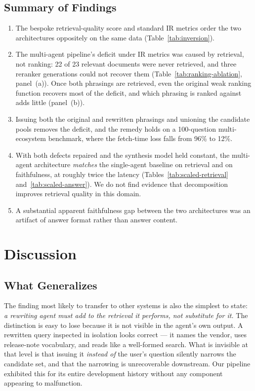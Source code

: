 \documentclass[acmsmall,review,anonymous,screen]{acmart}
\begin{document}
\subsection{Summary of Findings}\label{sec:results-summary}

\begin{enumerate}
  \item The bespoke retrieval-quality score and standard IR metrics order the
  two architectures oppositely on the same data (Table~\ref{tab:inversion}).
  \item The multi-agent pipeline's deficit under IR metrics was caused by
  retrieval, not ranking: 22 of 23 relevant documents were never retrieved,
  and three reranker generations could not recover them
  (Table~\ref{tab:ranking-ablation}, panel~(a)). Once both phrasings are
  retrieved, even the original weak ranking function recovers most of the
  deficit, and which phrasing is ranked against adds little
  (panel~(b)).
  \item Issuing both the original and rewritten phrasings and unioning the
  candidate pools removes the deficit, and the remedy holds on a
  100-question multi-ecosystem benchmark, where the fetch-time loss falls from
  96\% to 12\%.
  \item With both defects repaired and the synthesis model held constant, the
  multi-agent architecture \emph{matches} the single-agent baseline on retrieval
  and on faithfulness, at roughly twice the latency
  (Tables~\ref{tab:scaled-retrieval} and~\ref{tab:scaled-answer}). We do not
  find evidence that decomposition improves retrieval quality in this domain.
  \item A substantial apparent faithfulness gap between the two architectures
  was an artifact of answer format rather than answer content.
\end{enumerate}

\section{Discussion}\label{sec:discussion}

\subsection{What Generalizes}\label{sec:generalizes}

The finding most likely to transfer to other systems is also the simplest to
state: \emph{a rewriting agent must add to the retrieval it performs, not
substitute for it.} The distinction is easy to lose because it is not visible
in the agent's own output. A rewritten query inspected in isolation looks
correct --- it names the vendor, uses release-note vocabulary, and reads like a
well-formed search. What is invisible at that level is that issuing it
\emph{instead of} the user's question silently narrows the candidate set, and
that the narrowing is unrecoverable downstream. Our pipeline exhibited this for
its entire development history without any component appearing to malfunction.
\end{document}
